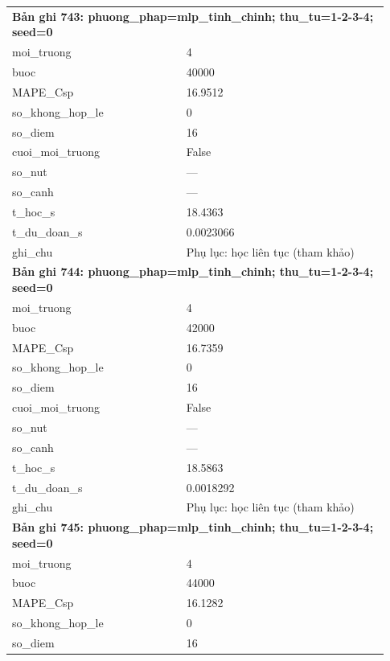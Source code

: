 \begin{longtable}{p{0.43\linewidth}p{0.50\linewidth}}
\midrule
\multicolumn{2}{p{0.95\linewidth}}{\textbf{Bản ghi 743: phuong\_phap=mlp\_tinh\_chinh; thu\_tu=1-2-3-4; seed=0}} \\
moi\_\allowbreak truong & 4 \\
buoc & 40000 \\
MAPE\_\allowbreak Csp & 16.9512 \\
so\_\allowbreak khong\_\allowbreak hop\_\allowbreak le & 0 \\
so\_\allowbreak diem & 16 \\
cuoi\_\allowbreak moi\_\allowbreak truong & False \\
so\_\allowbreak nut & — \\
so\_\allowbreak canh & — \\
t\_\allowbreak hoc\_\allowbreak s & 18.4363 \\
t\_\allowbreak du\_\allowbreak doan\_\allowbreak s & 0.0023066 \\
ghi\_\allowbreak chu & Phụ lục: học liên tục (tham khảo) \\
\midrule
\multicolumn{2}{p{0.95\linewidth}}{\textbf{Bản ghi 744: phuong\_phap=mlp\_tinh\_chinh; thu\_tu=1-2-3-4; seed=0}} \\
moi\_\allowbreak truong & 4 \\
buoc & 42000 \\
MAPE\_\allowbreak Csp & 16.7359 \\
so\_\allowbreak khong\_\allowbreak hop\_\allowbreak le & 0 \\
so\_\allowbreak diem & 16 \\
cuoi\_\allowbreak moi\_\allowbreak truong & False \\
so\_\allowbreak nut & — \\
so\_\allowbreak canh & — \\
t\_\allowbreak hoc\_\allowbreak s & 18.5863 \\
t\_\allowbreak du\_\allowbreak doan\_\allowbreak s & 0.0018292 \\
ghi\_\allowbreak chu & Phụ lục: học liên tục (tham khảo) \\
\midrule
\multicolumn{2}{p{0.95\linewidth}}{\textbf{Bản ghi 745: phuong\_phap=mlp\_tinh\_chinh; thu\_tu=1-2-3-4; seed=0}} \\
moi\_\allowbreak truong & 4 \\
buoc & 44000 \\
MAPE\_\allowbreak Csp & 16.1282 \\
so\_\allowbreak khong\_\allowbreak hop\_\allowbreak le & 0 \\
so\_\allowbreak diem & 16 \\

\end{longtable}
